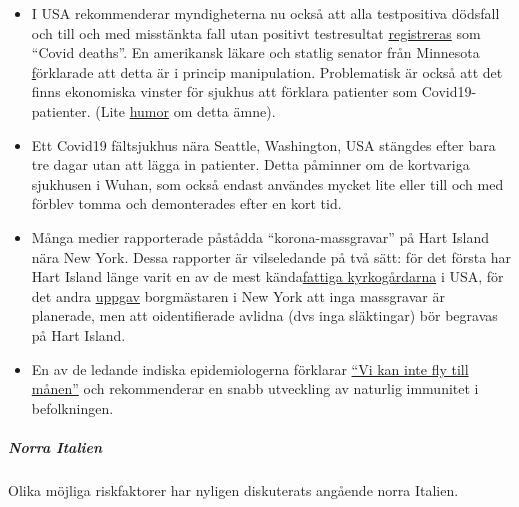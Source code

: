 \begin{itemize}
\tightlist
\item
  I USA rekommenderar myndigheterna nu också att alla testpositiva
  dödsfall och till och med misstänkta fall utan positivt testresultat
  \href{https://nypost.com/2020/04/07/feds-classify-all-coronavirus-patient-deaths-as-covid-19-deaths/?link=TD_mansionglobal_new_mansion_global.11147f181987fd93}{registreras}
  som ``Covid deaths''. En amerikansk läkare och statlig senator från
  Minnesota
  \href{https://www.valleynewslive.com/content/misc/Sen-Dr-Jensens-Shocking-Admission-About-Coronavirus-569458361.html}{f}örklarade
  att detta är i princip manipulation. Problematisk är också att det
  finns ekonomiska vinster för sjukhus att förklara patienter som
  Covid19-patienter. (Lite
  \href{https://swprs.files.wordpress.com/2020/04/cv-2019-2020.jpg}{humor}
  om detta ämne).
\item
  Ett Covid19 fältsjukhus nära Seattle, Washington, USA stängdes efter
  bara tre dagar utan att lägga in patienter. Detta påminner om de
  kortvariga sjukhusen i Wuhan, som också endast användes mycket lite
  eller till och med förblev tomma och demonterades efter en kort tid.
\item
  Många medier rapporterade påstådda ``korona-massgravar'' på Hart
  Island nära New York. Dessa rapporter är vilseledande på två sätt: för
  det första har Hart Island länge varit en av de mest
  kända\href{https://en.wikipedia.org/wiki/Hart_Island_(Bronx)\#Cemetery}{fattiga
  kyrkogårdarna} i USA, för det andra
  \href{https://www.independent.co.uk/news/world/americas/new-york-coronavirus-cases-burials-bodies-covid-19-hart-island-a9459956.html}{uppgav}
  borgmästaren i New York att inga massgravar är planerade, men att
  oidentifierade avlidna (dvs inga släktingar) bör begravas på Hart
  Island.
\item
  En av de ledande indiska epidemiologerna förklarar
  \href{https://www.business-standard.com/article/current-affairs/we-cannot-run-away-to-the-moon-need-to-develop-herd-immunity-dr-muliyil-120040601232_1.html}{``Vi
  kan inte fly till månen''} och rekommenderar en snabb utveckling av
  naturlig immunitet i befolkningen.
\end{itemize}

\hypertarget{norra-italien}{%
\subparagraph{\texorpdfstring{\textbf{Norra
Italien}}{Norra Italien}}\label{norra-italien}}

Olika möjliga riskfaktorer har nyligen diskuterats angående norra
Italien.

